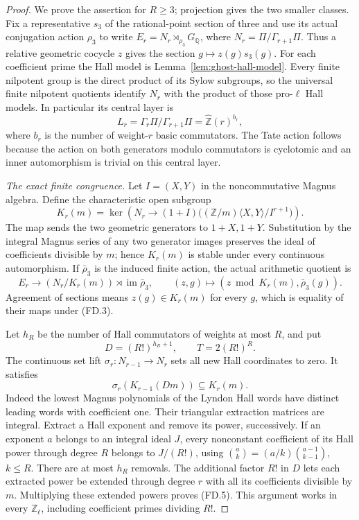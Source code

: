 \begin{proof}
We prove the assertion for \(R\ge3\); projection
gives the two smaller classes. Fix a representative
\(s_3\) of the rational-point section of three and
use its actual conjugation action \(\rho_3\) to
write \(E_r=N_r\rtimes_{\rho_3}G_{\mathbb Q}\),
where \(N_r=\Pi/\Gamma_{r+1}\Pi\). Thus a relative
geometric cocycle \(z\) gives the section
\(g\mapsto z(g)s_3(g)\). For each coefficient prime
the Hall model is Lemma~\ref{lem:ghost-hall-model}.
Every finite nilpotent group is the direct product
of its Sylow subgroups, so the universal finite
nilpotent quotients identify \(N_r\) with the
product of those pro-\(\ell\) Hall models. In
particular its central layer is
\[
 L_r=\Gamma_r\Pi/\Gamma_{r+1}\Pi
       =\widehat{\mathbb Z}(r)^{b_r},
 \tag{FD.1}
\]
where \(b_r\) is the number of weight-\(r\) basic
commutators. The Tate action follows because the
action on both generators modulo commutators is
cyclotomic and an inner automorphism is trivial
on this central layer.

\emph{The exact finite congruence.}
Let \(I=(X,Y)\) in the noncommutative Magnus
algebra. Define the characteristic open subgroup
\[
 K_r(m)=\ker\left(N_r\longrightarrow
       (1+I)\bigl((\mathbb Z/m)\langle X,Y\rangle/I^{r+1}\bigr)
                       \right).
 \tag{FD.2}
\]
The map sends the two geometric generators to
\(1+X,1+Y\). Substitution by the integral Magnus
series of any two generator images preserves the
ideal of coefficients divisible by \(m\); hence
\(K_r(m)\) is stable under every continuous
automorphism. If \(\bar\rho_3\) is the induced
finite action, the actual arithmetic quotient is
\[
 E_r\longrightarrow
 (N_r/K_r(m))\rtimes\operatorname{im}\bar\rho_3,
 \qquad (z,g)\longmapsto(z\bmod K_r(m),\bar\rho_3(g)).
 \tag{FD.3}
\]
Agreement of sections means \(z(g)\in K_r(m)\)
for every \(g\), which is equality of their maps
under (FD.3).

Let \(h_R\) be the number of Hall commutators of
weights at most \(R\), and put
\[
 D=(R!)^{h_R+1},\qquad T=2(R!)^R.
 \tag{FD.4}
\]
The continuous set lift \(\sigma_r:N_{r-1}\to N_r\)
sets all new Hall coordinates to zero. It satisfies
\[
 \sigma_r(K_{r-1}(Dm))\subseteq K_r(m).
 \tag{FD.5}
\]
Indeed the lowest Magnus polynomials of the Lyndon
Hall words have distinct leading words with
coefficient one. Their triangular extraction
matrices are integral. Extract a Hall exponent
and remove its power, successively. If an
exponent \(a\) belongs to an integral ideal \(J\),
every nonconstant coefficient of its Hall power
through degree \(R\) belongs to \(J/(R!)\),
using
\(\binom ak=(a/k)\binom{a-1}{k-1}\), \(k\le R\).
There are at most \(h_R\) removals. The additional
factor \(R!\) in \(D\) lets each extracted power
be extended through degree \(r\) with all its
coefficients divisible by \(m\). Multiplying
these extended powers proves (FD.5). This
argument works in every \(\mathbb Z_\ell\),
including coefficient primes dividing \(R!\).


\end{proof}
